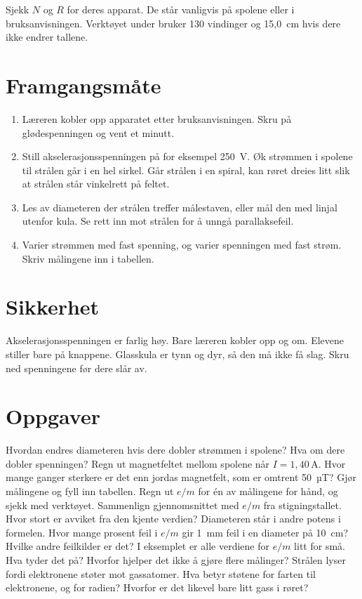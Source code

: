 \documentclass[11pt]{article}
\begin{document}
Sjekk $N$ og $R$ for deres apparat. De står vanligvis på spolene eller i bruksanvisningen. Verktøyet under bruker 130 vindinger og 15,0~cm hvis dere ikke endrer tallene.

\section*{Framgangsmåte}

\begin{enumerate}
\item Læreren kobler opp apparatet etter bruksanvisningen. Skru på glødespenningen og vent et minutt.
\item Still akselerasjonsspenningen på for eksempel 250~V. Øk strømmen i spolene til strålen går i en hel sirkel. Går strålen i en spiral, kan røret dreies litt slik at strålen står vinkelrett på feltet.
\item Les av diameteren der strålen treffer målestaven, eller mål den med linjal utenfor kula. Se rett inn mot strålen for å unngå parallaksefeil.
\item Varier strømmen med fast spenning, og varier spenningen med fast strøm. Skriv målingene inn i tabellen.
\end{enumerate}

\section*{Sikkerhet}

Akselerasjonsspenningen er farlig høy. Bare læreren kobler opp og om. Elevene stiller bare på knappene. Glasskula er tynn og dyr, så den må ikke få slag. Skru ned spenningene før dere slår av.

\section*{Oppgaver}

\begin{oppgaveliste}
\oppgave {}Hvordan endres diameteren hvis dere dobler strømmen i spolene? Hva om dere dobler spenningen?
\svar
\oppgave {}Regn ut magnetfeltet mellom spolene når $I = 1{,}40\,\mathrm{A}$. Hvor mange ganger sterkere er det enn jordas magnetfelt, som er omtrent 50~µT?
\svar
\oppgave {}Gjør målingene og fyll inn tabellen. Regn ut $e/m$ for én av målingene for hånd, og sjekk med verktøyet.
\svar
\oppgave {}Sammenlign gjennomsnittet med $e/m$ fra stigningstallet. Hvor stort er avviket fra den kjente verdien?
\svar
\oppgave {}Diameteren står i andre potens i formelen. Hvor mange prosent feil i $e/m$ gir 1~mm feil i en diameter på 10~cm? Hvilke andre feilkilder er det?
\svar
\oppgave {}I eksemplet er alle verdiene for $e/m$ litt for små. Hva tyder det på? Hvorfor hjelper det ikke å gjøre flere målinger?
\svar
\oppgave {}Strålen lyser fordi elektronene støter mot gassatomer. Hva betyr støtene for farten til elektronene, og for radien? Hvorfor er det likevel bare litt gass i røret?
\svar
\end{oppgaveliste}
\end{document}
